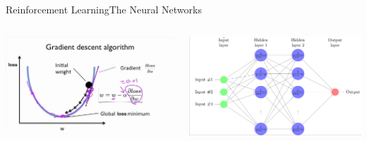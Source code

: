 \documentclass{beamer}
\begin{document}
\begin{frame}{Reinforcement Learning}{The Neural Networks\vphantom{(y}}
\vspace{-0.7em}

\begin{columns}
    \begin{column}{0.48\textwidth}
     \includegraphics[width=1\textwidth]{images/gradient_descent.png}
    \end{column}
    \begin{column}{0.48\textwidth}
        \includegraphics[width=1\textwidth]{images/NN_illu.png}
    \end{column}
\end{columns}
\end{frame}
\end{document}

